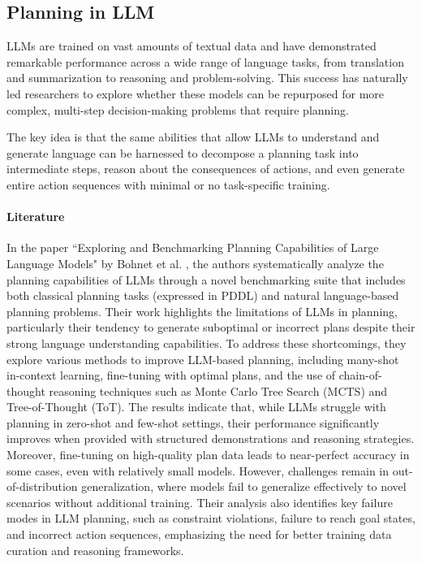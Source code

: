 \subsection{Planning in LLM}

LLMs are trained on vast amounts of textual data and have demonstrated
remarkable performance across a wide range of language tasks, from translation and
summarization to reasoning and problem-solving. This success has naturally led
researchers to explore whether these models can be repurposed for more complex, multi-step
decision-making problems that require planning.

The key idea is that the same abilities that allow LLMs to understand and generate
language can be harnessed to decompose a planning task into intermediate steps,
reason about the consequences of actions, and even generate entire action sequences
with minimal or no task-specific training.

\paragraph{Literature}
In the paper ``Exploring and Benchmarking Planning Capabilities of Large
Language Models" by Bohnet et al.
\cite{bohnet2024exploringbenchmarkingplanningcapabilities}, the authors systematically
analyze the planning capabilities of LLMs through a novel benchmarking suite that
includes both classical planning tasks (expressed in PDDL) and natural language-based
planning problems. Their work highlights the limitations of LLMs in planning, particularly
their tendency to generate suboptimal or incorrect plans despite their strong language
understanding capabilities. To address these shortcomings, they explore various methods
to improve LLM-based planning, including many-shot in-context learning, fine-tuning
with optimal plans, and the use of chain-of-thought reasoning techniques such as
Monte Carlo Tree Search (MCTS) and Tree-of-Thought (ToT). The results indicate that,
while LLMs struggle with planning in zero-shot and few-shot settings, their performance
significantly improves when provided with structured demonstrations and reasoning
strategies. Moreover, fine-tuning on high-quality plan data leads to near-perfect
accuracy in some cases, even with relatively small models. However, challenges
remain in out-of-distribution generalization, where models fail to generalize effectively
to novel scenarios without additional training. Their analysis also identifies
key failure modes in LLM planning, such as constraint violations, failure to
reach goal states, and incorrect action sequences, emphasizing the need for
better training data curation and reasoning frameworks.

